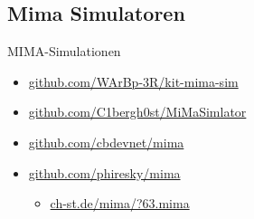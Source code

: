 \subsection{Mima Simulatoren} %
\begin{frame}{MIMA-Simulationen}
	    \begin{itemize}
	    	\item \url{github.com/WArBp-3R/kit-mima-sim}
	    	\item \url{github.com/C1bergh0st/MiMaSimlator}
	    	\item \url{github.com/cbdevnet/mima}
	    	\item \url{github.com/phiresky/mima}
	    	\begin{itemize}
	    		\item \url{ch-st.de/mima/?63.mima}
	    	\end{itemize}
	    \end{itemize}
	\end{frame}
